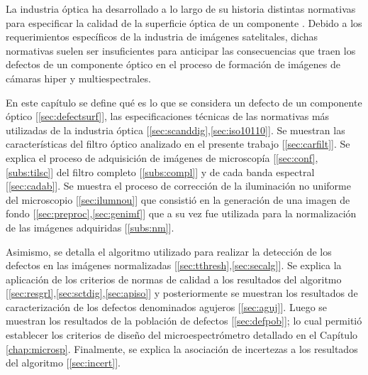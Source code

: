 

\singlespacing
{}
\label{chap:zeiss}

\hspace{0.5cm}La industria óptica ha desarrollado a lo largo de su historia distintas normativas para especificar la calidad de la superficie óptica de un componente \cite{cosm}. Debido a los requerimientos específicos de la industria de imágenes satelitales, dichas normativas suelen ser insuficientes para anticipar las consecuencias que traen los defectos de un componente óptico en el proceso de formación de imágenes de cámaras hiper y multiespectrales.

En este capítulo se define qué es lo que se considera un defecto de un componente óptico [\ref{sec:defectsurf}], las especificaciones técnicas de las normativas más utilizadas de la industria óptica [\ref{sec:scanddig},\ref{sec:iso10110}]. Se muestran las características del filtro óptico analizado en el presente trabajo [\ref{sec:carfilt}]. Se explica el proceso de adquisición de imágenes de microscopía [\ref{sec:conf},\ref{subs:tilsc}] del filtro completo [\ref{subs:compl}] y de cada banda espectral [\ref{sec:cadab}]. Se muestra el proceso de corrección de la iluminación no uniforme del microscopio [\ref{sec:ilumnou}]  que consistió en la generación de una imagen de fondo [\ref{sec:preproc},\ref{sec:genimf}] que a su vez fue utilizada para la normalización de las imágenes adquiridas [\ref{subs:nm}].

Asimismo, se detalla el algoritmo utilizado para realizar la detección de los defectos en las imágenes normalizadas [\ref{sec:tthresh},\ref{sec:secalg}]. Se explica la aplicación de los criterios de normas de calidad a los resultados del algoritmo [\ref{sec:resgrl},\ref{sec:sctdig},\ref{sec:apiso}] y posteriormente se muestran los resultados de caracterización de los defectos denominados agujeros [\ref{sec:aguj}]. Luego se muestran los resultados de la población de defectos [\ref{sec:defpob}]; lo cual permitió establecer los criterios de diseño del microespectrómetro detallado en el Capítulo \ref{chap:microsp}. Finalmente, se explica la asociación de incertezas a los resultados del algoritmo [\ref{sec:incert}].

